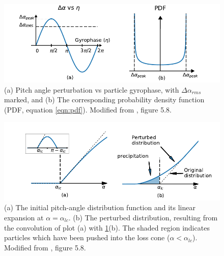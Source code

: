 \begin{equation}
\end{equation}


\begin{figure}[t]
\begin{center}
\includegraphics{figures/da_dist_and_pdf.pdf}
\caption[Pitch angle perturbation vs gyrophase, and corresponding PDF]{(a) Pitch angle perturbation vs particle gyrophase, with $\Delta \alpha_{rms}$ marked, and (b) The corresponding probability density function (PDF, equation \ref{eqn:pdf}). Modified from \cite{Bortnik2005}, figure 5.8.}
\label{fig:da_vs_eta_and_pdf}
\end{center}
\end{figure}

\begin{figure}[h]
\begin{center}
\includegraphics{figures/da_dist_and_perturbation.pdf}
\caption[Perturbed pitch-angle distribution]{(a) The initial pitch-angle distribution function and its linear expansion at $\alpha = \alpha_{lc}$. (b) The perturbed distribution, resulting from the convolution of plot (a) with \ref{fig:da_vs_eta_and_pdf}(b). The shaded region indicates particles which have been pushed into the loss cone ($\alpha < \alpha_{lc}$). Modified from \cite{Bortnik2005}, figure 5.8.}
\label{fig:da_dist_and_perturbation}
\end{center}
\end{figure}

